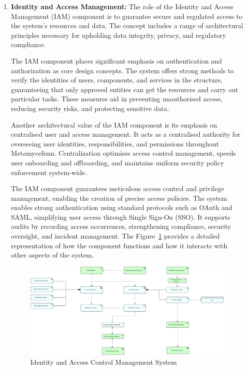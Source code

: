 \documentclass[preprint,12pt]{elsarticle}
\begin{document}
\begin{enumerate}
    Data domains can utilise the PaaS API to request, set up, and oversee resources, allowing them to function autonomously and effectively. Decentralising infrastructure management improves agility and flexibility in the system.
    
    \textit{Addresses requirements: SaP-1, SaP-2, Var-1, Var-3, Var-4, Vel-1, and Vol-2.} 

    \item \textbf{Identity and Access Management:} The role of the Identity and Access Management (IAM) component is to guarantee secure and regulated access to the system's resources and data. The concept includes a range of architectural principles necessary for upholding data integrity, privacy, and regulatory compliance.

    The IAM component places significant emphasis on authentication and authorization as core design concepts. The system offers strong methods to verify the identities of users, components, and services in the structure, guaranteeing that only approved entities can get the resources and carry out particular tasks. These measures aid in preventing unauthorised access, reducing security risks, and protecting sensitive data.
    
    Another architectural value of the IAM component is its emphasis on centralised user and access management. It acts as a centralised authority for overseeing user identities, responsibilities, and permissions throughout Metamycelium. Centralization optimises access control management, speeds user onboarding and offboarding, and maintains uniform security policy enforcement system-wide.
    
    The IAM component guarantees meticulous access control and privilege management, enabling the creation of precise access policies. The system enables strong authentication using standard protocols such as OAuth and SAML, simplifying user access through Single Sign-On (SSO). It supports audits by recording access occurrences, strengthening compliance, security oversight, and incident management. The Figure~\ref{diagram:IAM} provides a detailed representation of how the component functions and how it interacts with other aspects of the system.

    \begin{figure}[h]
        \includegraphics[width=\textwidth]{images/Metamycelium-identity-and-access-control.jpg}
        \caption{Identity and Access Control Management System}
        \label{diagram:IAM}
    \end{figure}


\end{enumerate}
\end{document}
